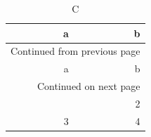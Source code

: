 \documentclass[11pt]{article}
\author{root}
\date{\today}
\title{}
\begin{document}
\tableofcontents

\begin{longtable}{rr}
\caption{C}
\\[0pt]
\toprule
a & b\\[0pt]
\midrule
\endfirsthead
\multicolumn{2}{l}{Continued from previous page} \\[0pt]
\toprule

a & b \\[0pt]

\midrule
\endhead
\midrule\multicolumn{2}{r}{Continued on next page} \\
\endfoot
\endlastfoot
1 & 2\\[0pt]
3 & 4\\[0pt]
\bottomrule
\end{longtable}
\end{document}
